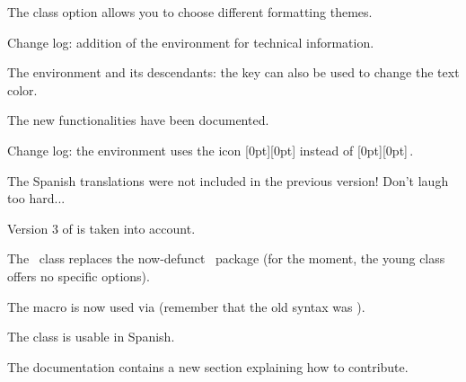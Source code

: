 \begin{tdocnew}
    \item The  class option allows you to choose different formatting themes.

    \item Change log: addition of the  environment for technical information.

    \item The  environment and its descendants: the  key can also be used to change the text color.

    \item The new functionalities have been documented.
\end{tdocnew}


\begin{tdocupdate}
    \item Change log: the  environment uses the icon
    \raisebox{0pt}[0pt][0pt]{}
    instead of
    \raisebox{0pt}[0pt][0pt]{\fbox{\faMagic}}\,.
\end{tdocupdate}


\begin{tdocfix}
    \item The Spanish translations were not included in the previous version! Don't laugh too hard...
\end{tdocfix}

\tdocsep




\begin{tdoctech}[version = 1.5.0, date = 2024-10-19]
    \item Version 3 of  is taken into account.
\end{tdoctech}


\begin{tdocbreak}
    \item The \thisproj\ class replaces the now-defunct \thisproj\ package (for the moment, the young class offers no specific options).

    \item The  macro is now used via  (remember that the old syntax was ).
\end{tdocbreak}


\begin{tdocnew}
    \item The class is usable in Spanish.

    \item The documentation contains a new section explaining how to contribute.
\end{tdocnew}


